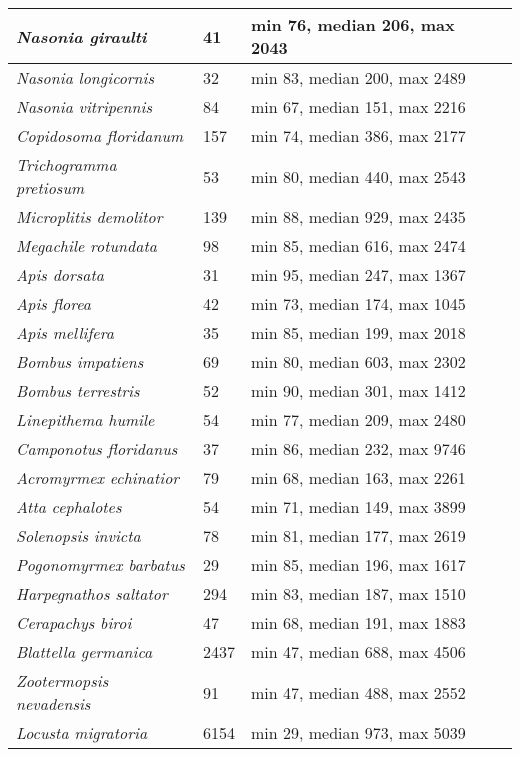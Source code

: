 {\begin{longtable}{| L{4cm} | L{2cm}  | L{5cm} | L{4cm} |}
\textit{Nasonia giraulti} & 41 & min 76, median 206, max 2043 & \\ \hline
\textit{Nasonia longicornis} & 32 & min 83, median 200, max 2489 & \\ \hline
\textit{Nasonia vitripennis} & 84 & min 67, median 151, max 2216 & \\ \hline
\textit{Copidosoma floridanum} & 157 & min 74, median 386, max 2177 & \\ \hline
\textit{Trichogramma pretiosum} & 53 & min 80, median 440, max 2543 & \\ \hline
\textit{Microplitis demolitor} & 139 & min 88, median 929, max 2435 & \\ \hline
\textit{Megachile rotundata} & 98 & min 85, median 616, max 2474 & \\ \hline
\textit{Apis dorsata} & 31 & min 95, median 247, max 1367 & \\ \hline
\textit{Apis florea} & 42 & min 73, median 174, max 1045 & \\ \hline
\textit{Apis mellifera} & 35 & min 85, median 199, max 2018 & \\ \hline
\textit{Bombus impatiens} & 69 & min 80, median 603, max 2302 & \\ \hline
\textit{Bombus terrestris} & 52 & min 90, median 301, max 1412 & \\ \hline
\textit{Linepithema humile} & 54 & min 77, median 209, max 2480 & \\ \hline
\textit{Camponotus floridanus} & 37 & min 86, median 232, max 9746 & \\ \hline
\textit{Acromyrmex echinatior} & 79 & min 68, median 163, max 2261 & \\ \hline
\textit{Atta cephalotes} & 54 & min 71, median 149, max 3899 & \\ \hline
\textit{Solenopsis invicta} & 78 & min 81, median 177, max 2619 & \\ \hline
\textit{Pogonomyrmex barbatus} & 29 & min 85, median 196, max 1617 & \\ \hline
\textit{Harpegnathos saltator} & 294 & min 83, median 187, max 1510 & \\ \hline
\textit{Cerapachys biroi} & 47 & min 68, median 191, max 1883 & \\ \hline
\textit{Blattella germanica} & 2437 & min 47, median 688, max 4506 & \\ \hline
\textit{Zootermopsis nevadensis} & 91 & min 47, median 488, max 2552 & \\ \hline
\textit{Locusta migratoria} & 6154 & min 29, median 973, max 5039 & \\ \hline

\end{longtable}}
